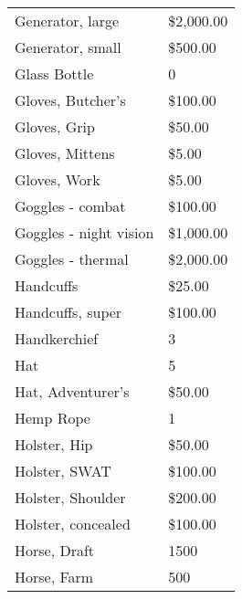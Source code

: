 \documentclass[twoside]{book}
\begin{document}
\begin{longtable}{p{1.25in}l}
  \raggedright
           Generator, large 
  &
   \$2,000.00 
  \tabularnewline
      
  \raggedright
           Generator, small 
  &
   \$500.00 
  \tabularnewline
      
  \raggedright
           Glass Bottle 
  &
   0 
  \tabularnewline
      
  \raggedright
           Gloves, Butcher's 
  &
   \$100.00 
  \tabularnewline
      
  \raggedright
           Gloves, Grip 
  &
   \$50.00 
  \tabularnewline
      
  \raggedright
           Gloves, Mittens 
  &
   \$5.00 
  \tabularnewline
      
  \raggedright
           Gloves, Work 
  &
   \$5.00 
  \tabularnewline
      
  \raggedright
           Goggles - combat 
  &
   \$100.00 
  \tabularnewline
      
  \raggedright
           Goggles - night vision 
  &
   \$1,000.00 
  \tabularnewline
      
  \raggedright
           Goggles - thermal 
  &
   \$2,000.00 
  \tabularnewline
      
  \raggedright
           Handcuffs 
  &
   \$25.00 
  \tabularnewline
      
  \raggedright
           Handcuffs, super 
  &
   \$100.00 
  \tabularnewline
      
  \raggedright
           Handkerchief 
  &
   3 
  \tabularnewline
      
  \raggedright
           Hat 
  &
   5 
  \tabularnewline
      
  \raggedright
           Hat, Adventurer's 
  &
   \$50.00 
  \tabularnewline
      
  \raggedright
           Hemp Rope 
  &
   1 
  \tabularnewline
      
  \raggedright
           Holster, Hip 
  &
   \$50.00 
  \tabularnewline
      
  \raggedright
           Holster, SWAT 
  &
   \$100.00 
  \tabularnewline
      
  \raggedright
           Holster, Shoulder 
  &
   \$200.00 
  \tabularnewline
      
  \raggedright
           Holster, concealed 
  &
   \$100.00 
  \tabularnewline
      
  \raggedright
           Horse, Draft 
  &
   1500 
  \tabularnewline
      
  \raggedright
           Horse, Farm 
  &
   500 
  \tabularnewline
      

\end{longtable}
\end{document}
